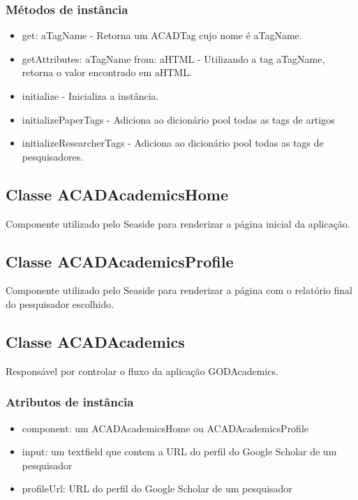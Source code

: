 \subsubsection{Métodos de instância}

\begin{itemize}
  \item get: aTagName - Retorna um ACADTag cujo nome é aTagName.

  \item getAttributes: aTagName from: aHTML - Utilizando a tag aTagName, retorna o valor encontrado em aHTML.

  \item initialize - Inicializa a instância.

  \item initializePaperTags - Adiciona ao dicionário pool todas as tags de artigos

  \item initializeResearcherTags - Adiciona ao dicionário pool todas as tags de pesquisadores.

\end{itemize}

\subsection{Classe ACADAcademicsHome}

Componente utilizado pelo Seaside para renderizar a página inicial da aplicação.

\subsection{Classe ACADAcademicsProfile}

Componente utilizado pelo Seaside para renderizar a página com o relatório final do pesquisador escolhido.

\subsection{Classe ACADAcademics}

Responsável por controlar o fluxo da aplicação GODAcademics.

\subsubsection{Atributos de instância}

\begin{itemize}
  \item component: um ACADAcademicsHome ou ACADAcademicsProfile

  \item input: um textfield que contem a URL do perfil do Google Scholar de um pesquisador

  \item profileUrl: URL do perfil do Google Scholar de um pesquisador

\end{itemize}

